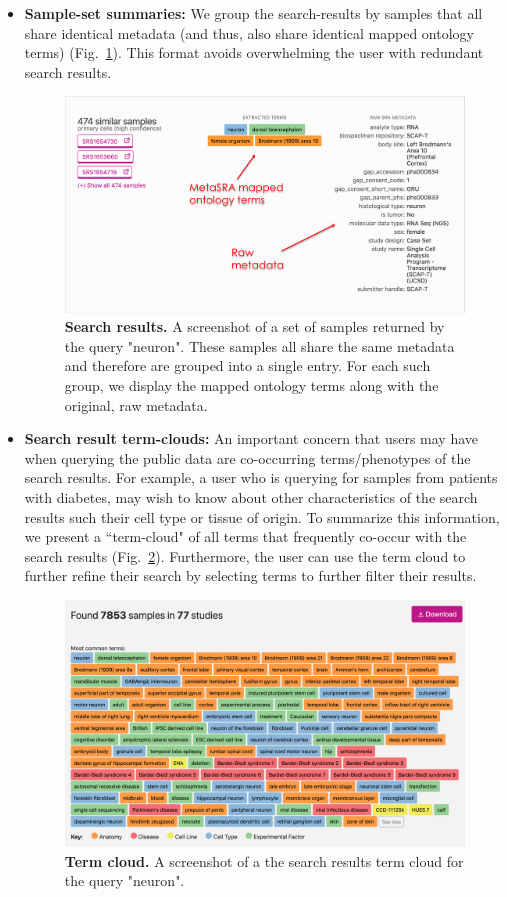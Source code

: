\begin{itemize}
\item \textbf{Sample-set summaries:} We group the search-results by samples that all share identical metadata (and thus, also share identical mapped ontology terms) (Fig.~\ref{fig:search_results}).  This format avoids overwhelming the user with redundant search results. 
\begin{figure}[htbp]
\centering
\includegraphics[width=12cm]{figures/search_results.png}
\caption{\textbf{Search results.} A screenshot of a set of samples returned by the query "neuron". These samples all share the same metadata and therefore are grouped into a single entry.  For each such group, we display the mapped ontology terms along with the original, raw metadata.}
\label{fig:search_results}
\end{figure}


\item \textbf{Search result term-clouds:} An important concern that users may have when querying the public data are co-occurring terms/phenotypes of the search results. For example, a user who is querying for samples from patients with diabetes, may wish to know about other characteristics of the search results such their cell type or tissue of origin.  To summarize this information, we present a ``term-cloud" of all terms that frequently co-occur with the search results (Fig.~\ref{fig:term_cloud}). Furthermore, the user can use the term cloud to further refine their search by selecting terms to further filter their results. 

\begin{figure}[htbp]
\centering
\includegraphics[width=12cm]{figures/term_cloud.png}
\caption{\textbf{Term cloud.} A screenshot of a the search results term cloud for the query "neuron".}
\label{fig:term_cloud}
\end{figure}

\end{itemize}





